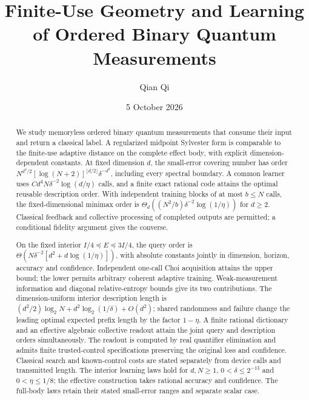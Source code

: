 \documentclass[11pt]{amsart}
\title[Finite-use measurement geometry and learning]{Finite-Use Geometry and Learning of Ordered Binary Quantum Measurements}
\author{Qian Qi}
\date{5 October 2026}
\numberwithin{equation}{section}
\theoremstyle{definition}\newtheorem{definition}[theorem]{Definition}
\theoremstyle{remark}\newtheorem{remark}[theorem]{Remark}
\begin{document}
\raggedbottom
\begin{abstract}
We study memoryless ordered binary quantum measurements that consume
their input and return a classical label.  A regularized midpoint
Sylvester form is comparable to the finite-use adaptive distance on
the complete effect body, with explicit dimension-dependent constants.
At fixed dimension $d$, the small-error covering number has order
\mbox{$N^{d^2/2}[\log(N+2)]^{\lfloor d/2\rfloor}\delta^{-d^2}$},
including every spectral boundary.
A common learner uses $Cd^4N\delta^{-2}\log(d/\eta)$ calls, and a
finite exact rational code attains the optimal reusable description
order.  With independent training blocks of at most $b\le N$
calls, the fixed-dimensional minimax order is
$\Theta_d((N^2/b)\delta^{-2}\log(1/\eta))$ for $d\ge2$.
Classical feedback and collective processing of completed outputs
are permitted; a conditional fidelity argument gives the converse.

On the fixed interior $I/4\preceq E\preceq3I/4$, the query order is
\mbox{$\Theta(N\delta^{-2}[d^2+d\log(1/\eta)])$},
with absolute constants jointly in dimension, horizon, accuracy and
confidence.  Independent one-call Choi acquisition attains the upper
bound; the lower permits arbitrary coherent adaptive training.
Weak-measurement information and diagonal relative-entropy bounds
give its two contributions.  The dimension-uniform interior
description length is
$(d^2/2)\log_2N+d^2\log_2(1/\delta)+O(d^2)$;
shared randomness and failure change the leading optimal expected
prefix length by the factor $1-\eta$.
A finite rational dictionary and an effective algebraic collective
readout attain the joint query and description orders simultaneously.
The readout is computed by real quantifier elimination and admits
finite trusted-control specifications preserving the original loss
and confidence.  Classical search and known-control costs are stated
separately from device calls and transmitted length.
The interior learning laws hold for $d,N\ge1$,
$0<\delta\le2^{-13}$ and $0<\eta\le1/8$; the effective
construction takes rational accuracy and confidence.
The full-body laws retain their stated small-error ranges and
separate scalar case.
\end{abstract}
\maketitle
















\appendix


\end{document}
